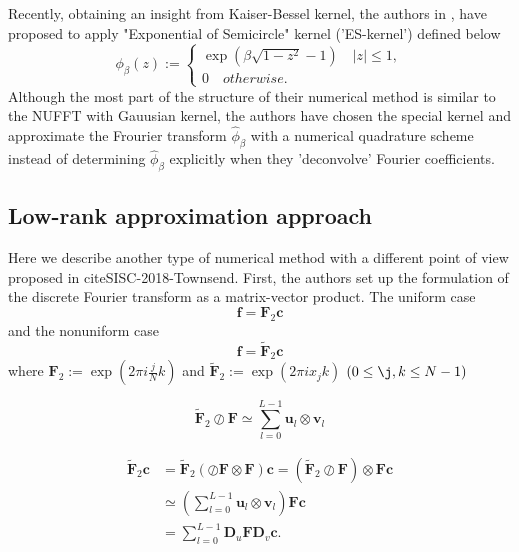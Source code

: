 Recently, obtaining an insight from Kaiser-Bessel kernel, the authors in \cite{SISC-2019-Barnett}, \cite{IEEE-2021-Barnett} have proposed to apply "Exponential of Semicircle" kernel ('ES-kernel') defined below 
\begin{equation}
  \phi_{\beta}(z) := 
  \begin{cases}
    \exp\left(\beta\sqrt{1-z^2} - 1\right) \quad |z| \le 1,\\
    0 \quad otherwise.
  \end{cases}
  \label{eq:ES-kernel}
\end{equation}
Although the most part of the structure of their numerical method is similar to the NUFFT with Gauusian kernel, the authors have chosen the special kernel and approximate the Frourier transform $\hat{\phi}_{\beta}$ with a numerical quadrature scheme instead of determining $\hat{\phi}_{\beta}$ explicitly when they 'deconvolve' Fourier coefficients.

\subsection{Low-rank approximation approach}
Here we describe another type of numerical method with a different point of view proposed in cite{SISC-2018-Townsend}.
First, the authors set up the formulation of the discrete Fourier transform as a matrix-vector product.
The uniform case
\begin{equation}
  \bm{f} = \bm{F}_{2}\bm{c} 
  \label{eq:matrix-vector-product-ufft-type-2}
\end{equation}
and the nonuniform case 
\begin{equation}
  \bm{f} = \tilde{\bm{F}}_{2}\bm{c} 
  \label{eq:matrix-vector-product-nufft-type-2}
\end{equation}
where 
$\bm{F}_{2} := \exp(2\pi i \frac{j}{N}k)$ and 
$\tilde{\bm{F}}_{2} := \exp(2\pi i x_{j}k)$ 
$(0 \le \j, k \le N-1)$

\begin{equation}
  \tilde{\bm{F}}_{2}\oslash\bm{F} \simeq 
  \sum_{l=0}^{L-1}\bm{u}_{l}\otimes\bm{v}_{l}
\end{equation}

\begin{align}
     \tilde{\bm{F}}_{2}\bm{c}
  &= \tilde{\bm{F}}_{2}\left(\oslash\bm{F}\otimes\bm{F}\right)\bm{c}
   = \left(\tilde{\bm{F}}_{2}\oslash\bm{F}\right)\otimes\bm{F}\bm{c} \\
  &\simeq \left(\sum_{l=0}^{L-1}\bm{u}_{l}\otimes\bm{v}_{l}\right)\bm{F}\bm{c} \\
  &= \sum_{l=0}^{L-1} \bm{D}_{u}\bm{F}\bm{D}_{v}\bm{c}.
\end{align}


